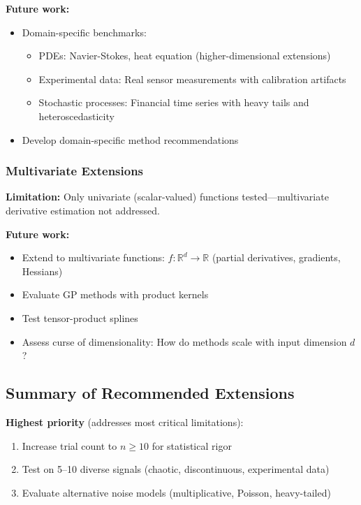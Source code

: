 \textbf{Future work:}
\begin{itemize}
    \item Domain-specific benchmarks:
    \begin{itemize}
        \item PDEs: Navier-Stokes, heat equation (higher-dimensional extensions)
        \item Experimental data: Real sensor measurements with calibration artifacts
        \item Stochastic processes: Financial time series with heavy tails and heteroscedasticity
    \end{itemize}
    \item Develop domain-specific method recommendations
\end{itemize}

\subsubsection{Multivariate Extensions}

\textbf{Limitation:} Only univariate (scalar-valued) functions tested—multivariate derivative estimation not addressed.

\textbf{Future work:}
\begin{itemize}
    \item Extend to multivariate functions: $f: \mathbb{R}^d \to \mathbb{R}$ (partial derivatives, gradients, Hessians)
    \item Evaluate GP methods with product kernels
    \item Test tensor-product splines
    \item Assess curse of dimensionality: How do methods scale with input dimension $d$?
\end{itemize}

\subsection{Summary of Recommended Extensions}

\textbf{Highest priority} (addresses most critical limitations):
\begin{enumerate}
    \item Increase trial count to $n \geq 10$ for statistical rigor
    \item Test on 5--10 diverse signals (chaotic, discontinuous, experimental data)
    \item Evaluate alternative noise models (multiplicative, Poisson, heavy-tailed)
\end{enumerate}

